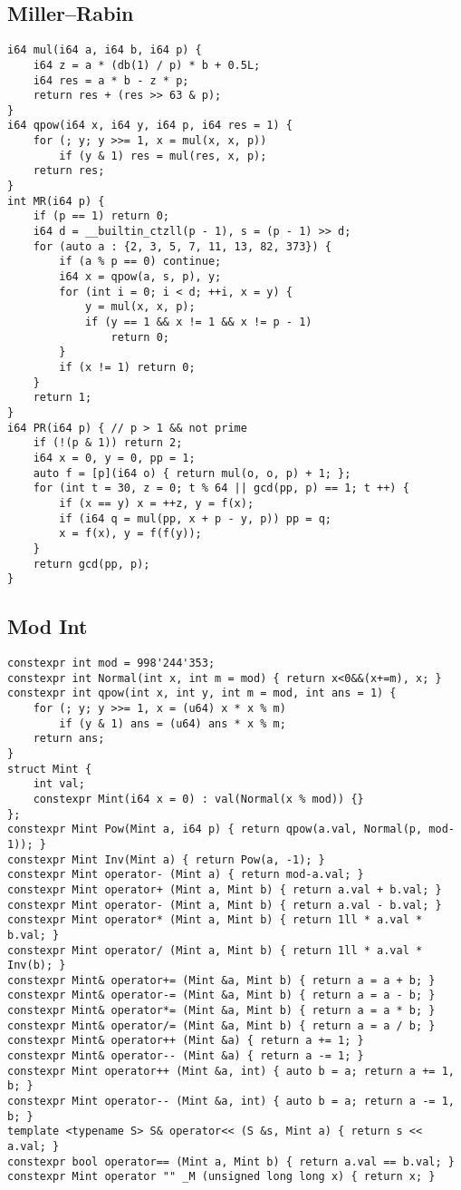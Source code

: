 \documentclass[a4paper,landscape,twocolumn]{ctexart}
\begin{document}
\subsection{Miller–Rabin}

\begin{lstlisting}
i64 mul(i64 a, i64 b, i64 p) {
	i64 z = a * (db(1) / p) * b + 0.5L;
	i64 res = a * b - z * p;
	return res + (res >> 63 & p);
}
i64 qpow(i64 x, i64 y, i64 p, i64 res = 1) {
	for (; y; y >>= 1, x = mul(x, x, p))
		if (y & 1) res = mul(res, x, p);
	return res;
}
int MR(i64 p) {
	if (p == 1) return 0;
	i64 d = __builtin_ctzll(p - 1), s = (p - 1) >> d;
	for (auto a : {2, 3, 5, 7, 11, 13, 82, 373}) {
		if (a % p == 0) continue;
		i64 x = qpow(a, s, p), y;
		for (int i = 0; i < d; ++i, x = y) {
			y = mul(x, x, p);
			if (y == 1 && x != 1 && x != p - 1)
				return 0;
		}
		if (x != 1) return 0;
	}
	return 1;
}
i64 PR(i64 p) { // p > 1 && not prime
	if (!(p & 1)) return 2;
	i64 x = 0, y = 0, pp = 1;
	auto f = [p](i64 o) { return mul(o, o, p) + 1; };
	for (int t = 30, z = 0; t % 64 || gcd(pp, p) == 1; t ++) {
		if (x == y) x = ++z, y = f(x);
		if (i64 q = mul(pp, x + p - y, p)) pp = q;
		x = f(x), y = f(f(y));
	}
	return gcd(pp, p);
}
\end{lstlisting}

\subsection{Mod Int}

\begin{lstlisting}[basicstyle=\footnotesize\ttfamily]
constexpr int mod = 998'244'353;
constexpr int Normal(int x, int m = mod) { return x<0&&(x+=m), x; }
constexpr int qpow(int x, int y, int m = mod, int ans = 1) {
	for (; y; y >>= 1, x = (u64) x * x % m)
		if (y & 1) ans = (u64) ans * x % m;
	return ans;
}
struct Mint {
	int val;
	constexpr Mint(i64 x = 0) : val(Normal(x % mod)) {}
};
constexpr Mint Pow(Mint a, i64 p) { return qpow(a.val, Normal(p, mod-1)); }
constexpr Mint Inv(Mint a) { return Pow(a, -1); }
constexpr Mint operator- (Mint a) { return mod-a.val; }
constexpr Mint operator+ (Mint a, Mint b) { return a.val + b.val; }
constexpr Mint operator- (Mint a, Mint b) { return a.val - b.val; }
constexpr Mint operator* (Mint a, Mint b) { return 1ll * a.val * b.val; }
constexpr Mint operator/ (Mint a, Mint b) { return 1ll * a.val * Inv(b); }
constexpr Mint& operator+= (Mint &a, Mint b) { return a = a + b; }
constexpr Mint& operator-= (Mint &a, Mint b) { return a = a - b; }
constexpr Mint& operator*= (Mint &a, Mint b) { return a = a * b; }
constexpr Mint& operator/= (Mint &a, Mint b) { return a = a / b; }
constexpr Mint& operator++ (Mint &a) { return a += 1; }
constexpr Mint& operator-- (Mint &a) { return a -= 1; }
constexpr Mint operator++ (Mint &a, int) { auto b = a; return a += 1, b; }
constexpr Mint operator-- (Mint &a, int) { auto b = a; return a -= 1, b; }
template <typename S> S& operator<< (S &s, Mint a) { return s << a.val; }
constexpr bool operator== (Mint a, Mint b) { return a.val == b.val; }
constexpr Mint operator "" _M (unsigned long long x) { return x; }
\end{lstlisting}
\end{document}
